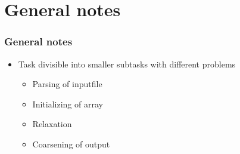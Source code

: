 \section{General notes}
\begin{frame}
  \frametitle{General notes}
  \begin{itemize}
  \item Task divisible into smaller subtasks with different problems
    \begin{itemize}
    \item Parsing of inputfile
    \item Initializing of array
    \item Relaxation
    \item Coarsening of output
    \end{itemize}
  \end{itemize}
\end{frame}
